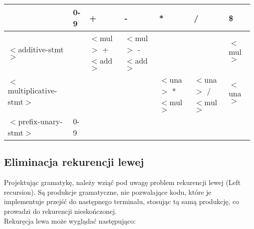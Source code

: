 \documentclass[leqno, 12pt]{article}
\newcommand{\spacing}{\vskip 0.5cm}
\begin{document}
			\spacing

			\begin{center}
				\setlength{\tabcolsep}{0.5em}
				\renewcommand{\arraystretch}{1.5}
				\begin{tabular}{ | L{4.1cm} | L{2cm} | L{2cm} | L{2cm} | L{2cm} | L{2cm} | L{2cm} | }
                  	\hline
                  	       & 0-9    & +    & -    & *    & /    & \$ \\
                  	\hline
              	 	$<$additive-stmt$>$
              	 	       &        & $<$mul$>$ + $<$add$>$
              	 	                & $<$mul$>$ - $<$add$>$
              	 	                & & & $<$mul$>$ \\
                  	\hline
                  	$<$multiplicative-stmt$>$ 
                  		   &        & & & $<$una$>$ * $<$mul$>$
                  		                & $<$una$>$ / $<$mul$>$
                  		                & $<$una$>$ \\
                  	\hline
                  	$<$prefix-unary-stmt$>$
                  	       & 0-9 & & & & & \\
                  	\hline
				\end{tabular}
			\end{center}

			\spacing

			\begin{center}
			\end{center}

		\subsection{Eliminacja rekurencji lewej}

			Projektując gramatykę, należy wziąć pod uwagę problem rekurencji lewej (Left recursion).
			Są produkcje gramatyczne, nie pozwalające kodu, które je implementuje przejść do następnego
			terminalu, stosując tą samą produkcję, co prowadzi do rekurencji nieskończonej.
			\\
			
			Rekuręcja lewa może wyglądać następująco:
\end{document}
